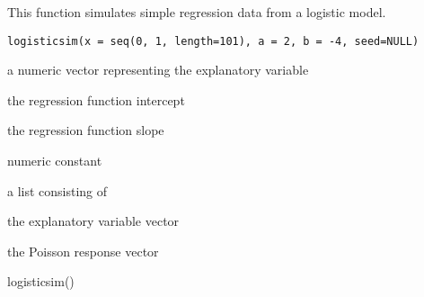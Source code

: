 \begin{Description}\relax
This function simulates simple regression data from a 
logistic model.
\end{Description}
\begin{Usage}
\begin{verbatim}
logisticsim(x = seq(0, 1, length=101), a = 2, b = -4, seed=NULL)
\end{verbatim}
\end{Usage}
\begin{Arguments}
\begin{ldescription}
\item[\code{x}] a numeric vector representing the explanatory variable
\item[\code{a}] the regression function intercept
\item[\code{b}] the regression function slope
\item[\code{seed}] numeric constant
\end{ldescription}
\end{Arguments}
\begin{Value}
a list consisting of
\begin{ldescription}
\item[\code{x}] the explanatory variable vector
\item[\code{y}] the Poisson response vector
\end{ldescription}
\end{Value}
\begin{Examples}
\begin{ExampleCode}
logisticsim()
\end{ExampleCode}
\end{Examples}

